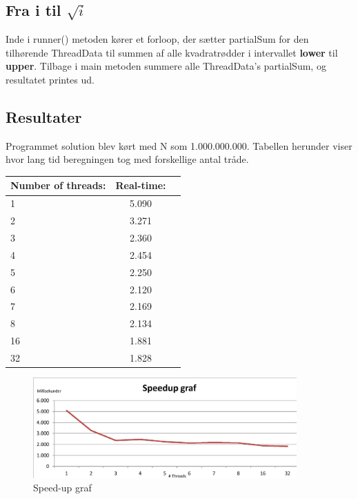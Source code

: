 \subsection{Fra i til $\sqrt{i}$}
Inde i runner() metoden kører et forloop, der sætter partialSum for den tilhørende ThreadData til summen af alle kvadratrødder i intervallet \textbf{lower} til \textbf{upper}. Tilbage i main metoden summere alle ThreadData's partialSum, og resultatet printes ud.

\subsection{Resultater}
Programmet solution blev kørt med N som 1.000.000.000. Tabellen herunder viser hvor lang tid beregningen tog med forskellige antal tråde.

\begin{center}
  \begin{tabular}{ | l | c | r | }
    \hline
    \textbf{Number of threads:} & \textbf{Real-time:} \\ \hline
    1 & 5.090 \\ \hline
	2 & 3.271 \\ \hline
	3 & 2.360 \\ \hline
	4 & 2.454 \\ \hline
	5 & 2.250 \\ \hline
	6 & 2.120 \\ \hline
	7 & 2.169 \\ \hline
	8 & 2.134 \\ \hline
	16 & 1.881 \\ \hline
	32 & 1.828 \\ \hline
  \end{tabular}
\end{center}

\begin{figure}[h!]
  \caption{Speed-up graf}
  \centering
    \includegraphics[width=0.9\textwidth]{Speedup-graf}
\end{figure}
